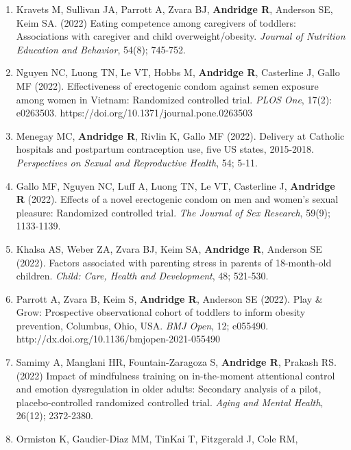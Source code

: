 \documentclass[
  english,
  letterpaper,
  DIV=11,
  numbers=noendperiod]{scrartcl}
\begin{document}
\begin{enumerate}
  B, Wesolowski R, VanDeusen JB, Williams NO, Sardesai SD, Noonan AM,
  Reinbolt RE, Stover DG, Cherian MA, Malarkey WB, \textbf{Andridge R}
  (2022). Breast cancer survivors' typhoid vaccine responses:
  Chemotherapy, obesity, and fitness make a difference. \emph{Brain,
  Behavior, and Immunity}, 103; 1-9.
\item
  Kravets M, Sullivan JA, Parrott A, Zvara BJ, \textbf{Andridge R},
  Anderson SE, Keim SA. (2022) Eating competence among caregivers of
  toddlers: Associations with caregiver and child overweight/obesity.
  \emph{Journal of Nutrition Education and Behavior}, 54(8); 745-752.
\item
  Nguyen NC, Luong TN, Le VT, Hobbs M, \textbf{Andridge R}, Casterline
  J, Gallo MF (2022). Effectiveness of erectogenic condom against semen
  exposure among women in Vietnam: Randomized controlled trial.
  \emph{PLOS One}, 17(2): e0263503.
  https://doi.org/10.1371/journal.pone.0263503
\item
  Menegay MC, \textbf{Andridge R}, Rivlin K, Gallo MF (2022). Delivery
  at Catholic hospitals and postpartum contraception use, five US
  states, 2015-2018. \emph{Perspectives on Sexual and Reproductive
  Health}, 54; 5-11.
\item
  Gallo MF, Nguyen NC, Luff A, Luong TN, Le VT, Casterline J,
  \textbf{Andridge R} (2022). Effects of a novel erectogenic condom on
  men and women's sexual pleasure: Randomized controlled trial.
  \emph{The Journal of Sex Research}, 59(9); 1133-1139.
\item
  Khalsa AS, Weber ZA, Zvara BJ, Keim SA, \textbf{Andridge R}, Anderson
  SE (2022). Factors associated with parenting stress in parents of
  18-month-old children. \emph{Child: Care, Health and Development}, 48;
  521-530.
\item
  Parrott A, Zvara B, Keim S, \textbf{Andridge R}, Anderson SE (2022).
  Play \& Grow: Prospective observational cohort of toddlers to inform
  obesity prevention, Columbus, Ohio, USA. \emph{BMJ Open}, 12; e055490.
  http://dx.doi.org/10.1136/bmjopen-2021-055490
\item
  Samimy A, Manglani HR, Fountain-Zaragoza S, \textbf{Andridge R},
  Prakash RS. (2022) Impact of mindfulness training on in-the-moment
  attentional control and emotion dysregulation in older adults:
  Secondary analysis of a pilot, placebo-controlled randomized
  controlled trial. \emph{Aging and Mental Health}, 26(12); 2372-2380.
\item
  Ormiston K, Gaudier-Diaz MM, TinKai T, Fitzgerald J, Cole RM,

\end{enumerate}
\end{document}
